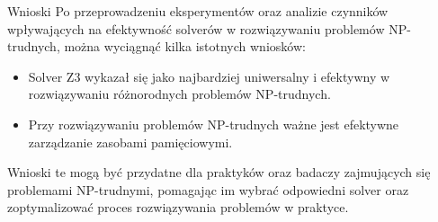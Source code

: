 \begin{frame}{Wnioski}
	Po przeprowadzeniu eksperymentów oraz analizie czynników wpływających na efektywność solverów w rozwiązywaniu problemów NP-trudnych, można wyciągnąć kilka istotnych wniosków:
	\begin{itemize}
		\item Solver Z3 wykazał się jako najbardziej uniwersalny i efektywny w rozwiązywaniu różnorodnych problemów NP-trudnych.
		
		\item Przy rozwiązywaniu problemów NP-trudnych ważne jest efektywne zarządzanie zasobami pamięciowymi.		
	\end{itemize}
\vspace{10pt}
Wnioski te mogą być przydatne dla praktyków oraz badaczy zajmujących się problemami NP-trudnymi, pomagając im wybrać odpowiedni solver oraz zoptymalizować proces rozwiązywania problemów w praktyce.

\end{frame}
